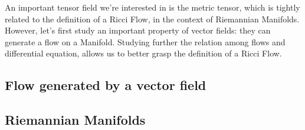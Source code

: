An important tensor field we're interested in is the metric tensor, which is tightly related to the definition of a Ricci Flow, in the context of Riemannian Manifolds. However, let's first study an important property of vector fields: they can generate a flow on a Manifold. Studying further the relation among flows and differential equation, allows us to better grasp the definition of a Ricci Flow.

\subsection{Flow generated by a vector field}

\subsection{Riemannian Manifolds}